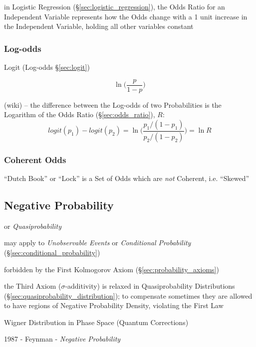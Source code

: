 in Logistic Regression (\S\ref{sec:logistic_regression}), the Odds Ratio for an
Independent Variable represents how the Odds change with a 1 unit increase in
the Independent Variable, holding all other variables constant



\subsubsection{Log-odds}\label{sec:log_odds}

Logit (Log-odds \S\ref{sec:logit})

\[
  \ln \Big(\frac{p}{1 - p}\Big)
\]

(wiki) --
the difference between the Log-odds of two Probabilities is the Logarithm
of the Odds Ratio (\S\ref{sec:odds_ratio}), $R$:
\[
  logit(p_1) - logit(p_2) = \ln\Big(\frac{p_1/(1 - p_1)}{p_2/(1 - p_2)}\Big)
    = \ln R
\]



\subsubsection{Coherent Odds}\label{sec:coherent_odds}

``Dutch Book'' or ``Lock'' is a Set of Odds which are \emph{not} Coherent, i.e.
``Skewed''



\subsection{Negative Probability}\label{sec:negative_probability}

or \emph{Quasiprobability}

may apply to \emph{Unobservable Events} or \emph{Conditional Probability}
(\S\ref{sec:conditional_probability})

forbidden by the First Kolmogorov Axiom (\S\ref{sec:probability_axioms})

the Third Axiom ($\sigma$-additivity) is relaxed in Quasiprobability
Distributions (\S\ref{sec:quasiprobability_distribution}); to compensate
sometimes they are allowed to have regions of Negative Probability Density,
violating the First Law

Wigner Distribution in Phase Space (Quantum Corrections)

1987 - Feynman - \emph{Negative Probability}

